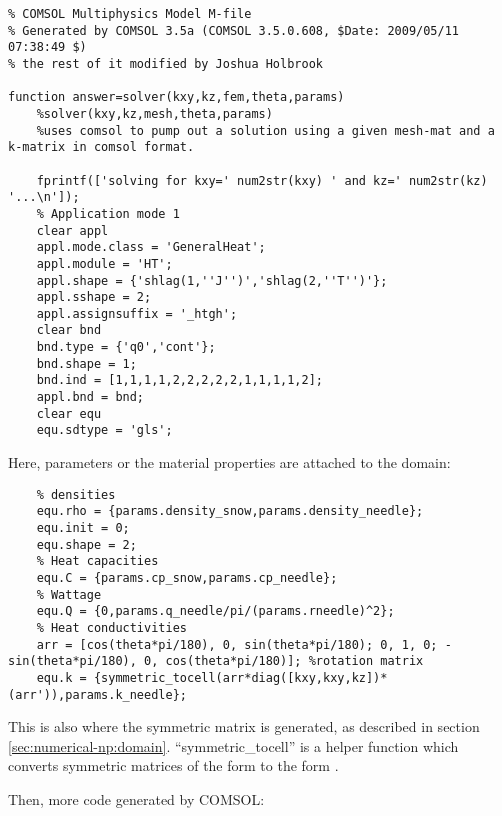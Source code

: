 \small
\begin{verbatim}
% COMSOL Multiphysics Model M-file
% Generated by COMSOL 3.5a (COMSOL 3.5.0.608, $Date: 2009/05/11 07:38:49 $)
% the rest of it modified by Joshua Holbrook

function answer=solver(kxy,kz,fem,theta,params)
    %solver(kxy,kz,mesh,theta,params)
    %uses comsol to pump out a solution using a given mesh-mat and a k-matrix in comsol format.

    fprintf(['solving for kxy=' num2str(kxy) ' and kz=' num2str(kz) '...\n']);
    % Application mode 1
    clear appl
    appl.mode.class = 'GeneralHeat';
    appl.module = 'HT';
    appl.shape = {'shlag(1,''J'')','shlag(2,''T'')'};
    appl.sshape = 2;
    appl.assignsuffix = '_htgh';
    clear bnd
    bnd.type = {'q0','cont'};
    bnd.shape = 1;
    bnd.ind = [1,1,1,1,2,2,2,2,2,1,1,1,1,2];
    appl.bnd = bnd;
    clear equ
    equ.sdtype = 'gls';
\end{verbatim}
\normalsize

Here, parameters or the material properties are attached to the domain:

\small
\begin{verbatim}
    % densities
    equ.rho = {params.density_snow,params.density_needle};
    equ.init = 0;
    equ.shape = 2;
    % Heat capacities
    equ.C = {params.cp_snow,params.cp_needle};
    % Wattage
    equ.Q = {0,params.q_needle/pi/(params.rneedle)^2};
    % Heat conductivities
    arr = [cos(theta*pi/180), 0, sin(theta*pi/180); 0, 1, 0; -sin(theta*pi/180), 0, cos(theta*pi/180)]; %rotation matrix
    equ.k = {symmetric_tocell(arr*diag([kxy,kxy,kz])*(arr')),params.k_needle};
\end{verbatim}
\normalsize

This is also where the symmetric matrix is generated, as described in section
\ref{sec:numerical-np:domain}. ``symmetric_tocell'' is a helper function which
converts symmetric matrices of the form 
 to the form
.

Then, more code generated by COMSOL:

